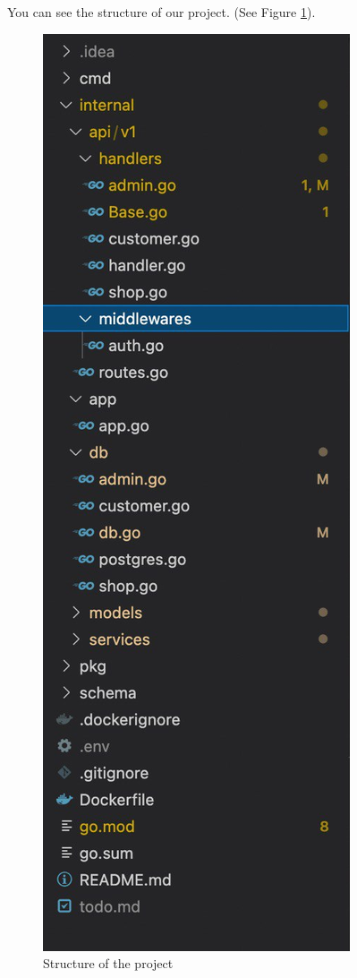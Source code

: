 You can see the structure of our project. (See Figure \ref{fig:backend1}).
\begin{figure}[ht!]
    \centering
    \includegraphics[scale=0.7]{figures/backend1.jpg}
    \caption{Structure of the project}
    \label{fig:backend1}
\end{figure}

